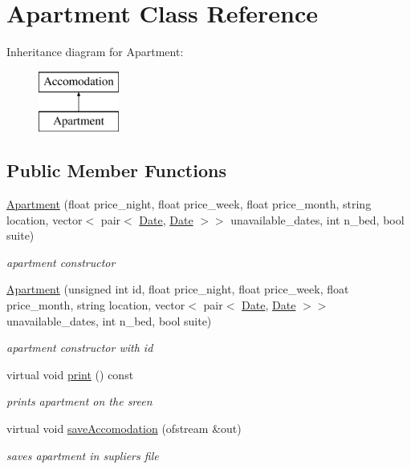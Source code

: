 \hypertarget{class_apartment}{}\section{Apartment Class Reference}
\label{class_apartment}
Inheritance diagram for Apartment\+:\begin{figure}[H]
\begin{center}
\leavevmode
\includegraphics[height=2.000000cm]{class_apartment}
\end{center}
\end{figure}
\subsection*{Public Member Functions}
\begin{DoxyCompactItemize}
\item 
\hyperlink{class_apartment_a8851834df1a78dac09f42f67ab3feef5}{Apartment} (float price\+\_\+night, float price\+\_\+week, float price\+\_\+month, string location, vector$<$ pair$<$ \hyperlink{class_date}{Date}, \hyperlink{class_date}{Date} $>$$>$ unavailable\+\_\+dates, int n\+\_\+bed, bool suite)
\begin{DoxyCompactList}\small\item\em apartment constructor \end{DoxyCompactList}\item 
\hyperlink{class_apartment_aef273f2999734bfb67eff6bf74726db9}{Apartment} (unsigned int id, float price\+\_\+night, float price\+\_\+week, float price\+\_\+month, string location, vector$<$ pair$<$ \hyperlink{class_date}{Date}, \hyperlink{class_date}{Date} $>$$>$ unavailable\+\_\+dates, int n\+\_\+bed, bool suite)
\begin{DoxyCompactList}\small\item\em apartment constructor with id \end{DoxyCompactList}\item 
\hypertarget{class_apartment_a579261a498031a59514f3a5021a437c1}{}\label{class_apartment_a579261a498031a59514f3a5021a437c1} 
virtual void \hyperlink{class_apartment_a579261a498031a59514f3a5021a437c1}{print} () const
\begin{DoxyCompactList}\small\item\em prints apartment on the sreen \end{DoxyCompactList}\item 
virtual void \hyperlink{class_apartment_af30f7fa6ee2877315b553614dcfad9f2}{save\+Accomodation} (ofstream \&out)
\begin{DoxyCompactList}\small\item\em saves apartment in supliers file \end{DoxyCompactList}\end{DoxyCompactItemize}
